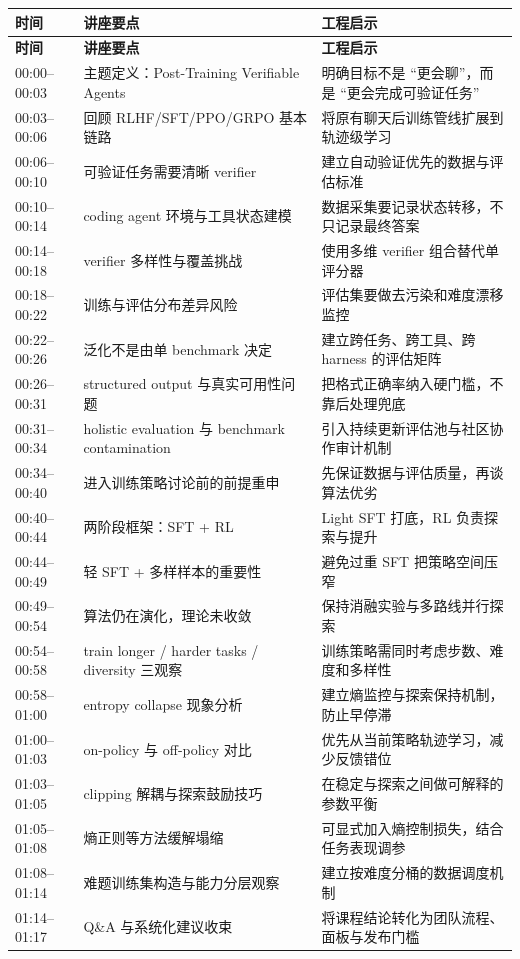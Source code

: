 \documentclass[a4paper]{article}
\begin{document}
\begin{longtable}{p{1.8cm}p{3.8cm}p{5.4cm}}
\toprule
\textbf{时间} & \textbf{讲座要点} & \textbf{工程启示} \\
\midrule
\endfirsthead
\toprule
\textbf{时间} & \textbf{讲座要点} & \textbf{工程启示} \\
\midrule
\endhead
00:00--00:03 & 主题定义：Post-Training Verifiable Agents & 明确目标不是 ``更会聊''，而是 ``更会完成可验证任务'' \\
00:03--00:06 & 回顾 RLHF/SFT/PPO/GRPO 基本链路 & 将原有聊天后训练管线扩展到轨迹级学习 \\
00:06--00:10 & 可验证任务需要清晰 verifier & 建立自动验证优先的数据与评估标准 \\
00:10--00:14 & coding agent 环境与工具状态建模 & 数据采集要记录状态转移，不只记录最终答案 \\
00:14--00:18 & verifier 多样性与覆盖挑战 & 使用多维 verifier 组合替代单评分器 \\
00:18--00:22 & 训练与评估分布差异风险 & 评估集要做去污染和难度漂移监控 \\
00:22--00:26 & 泛化不是由单 benchmark 决定 & 建立跨任务、跨工具、跨 harness 的评估矩阵 \\
00:26--00:31 & structured output 与真实可用性问题 & 把格式正确率纳入硬门槛，不靠后处理兜底 \\
00:31--00:34 & holistic evaluation 与 benchmark contamination & 引入持续更新评估池与社区协作审计机制 \\
00:34--00:40 & 进入训练策略讨论前的前提重申 & 先保证数据与评估质量，再谈算法优劣 \\
00:40--00:44 & 两阶段框架：SFT + RL & Light SFT 打底，RL 负责探索与提升 \\
00:44--00:49 & 轻 SFT + 多样样本的重要性 & 避免过重 SFT 把策略空间压窄 \\
00:49--00:54 & 算法仍在演化，理论未收敛 & 保持消融实验与多路线并行探索 \\
00:54--00:58 & train longer / harder tasks / diversity 三观察 & 训练策略需同时考虑步数、难度和多样性 \\
00:58--01:00 & entropy collapse 现象分析 & 建立熵监控与探索保持机制，防止早停滞 \\
01:00--01:03 & on-policy 与 off-policy 对比 & 优先从当前策略轨迹学习，减少反馈错位 \\
01:03--01:05 & clipping 解耦与探索鼓励技巧 & 在稳定与探索之间做可解释的参数平衡 \\
01:05--01:08 & 熵正则等方法缓解塌缩 & 可显式加入熵控制损失，结合任务表现调参 \\
01:08--01:14 & 难题训练集构造与能力分层观察 & 建立按难度分桶的数据调度机制 \\
01:14--01:17 & Q\&A 与系统化建议收束 & 将课程结论转化为团队流程、面板与发布门槛 \\
\bottomrule
\end{longtable}
\end{document}

